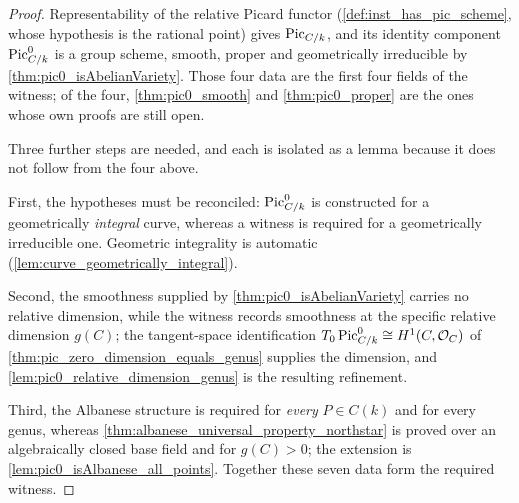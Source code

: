 \begin{proof}
  Representability of the relative Picard functor
  (\cref{def:inst_has_pic_scheme}, whose hypothesis is the rational point) gives
  \(\operatorname{Pic}_{C/k}\), and its identity component \(\operatorname{Pic}^0_{C/k}\) is a group scheme,
  smooth, proper and geometrically irreducible by
  \cref{thm:pic0_isAbelianVariety}. Those four data are the first four fields of
  the witness; of the four, \cref{thm:pic0_smooth} and \cref{thm:pic0_proper} are
  the ones whose own proofs are still open.

  Three further steps are needed, and each is isolated as a lemma because it does
  not follow from the four above.

  First, the hypotheses must be reconciled: \(\operatorname{Pic}^0_{C/k}\) is constructed for a
  geometrically \emph{integral} curve, whereas a witness is required for a
  geometrically irreducible one. Geometric integrality is automatic
  (\cref{lem:curve_geometrically_integral}).

  Second, the smoothness supplied by \cref{thm:pic0_isAbelianVariety} carries no
  relative dimension, while the witness records smoothness at the specific
  relative dimension \(g(C)\); the tangent-space identification
  \(T_0\operatorname{Pic}^0_{C/k}\cong H^1(C,\mathcal O_C)\) of
  \cref{thm:pic_zero_dimension_equals_genus} supplies the dimension, and
  \cref{lem:pic0_relative_dimension_genus} is the resulting refinement.

  Third, the Albanese structure is required for \emph{every} \(P\in C(k)\) and for
  every genus, whereas \cref{thm:albanese_universal_property_northstar} is proved
  over an algebraically closed base field and for \(g(C) > 0\); the extension is
  \cref{lem:pic0_isAlbanese_all_points}. Together these seven data form the
  required witness.
\end{proof}

